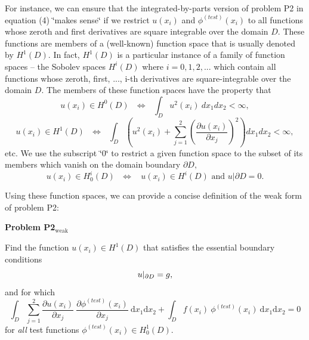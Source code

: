 For instance, we can ensure that the integrated-\/by-\/parts version of problem P2 in equation (4) \char`\"{}makes sense\char`\"{} if we restrict $u(x_i)$ and $\phi^{(test)}(x_i)$ to all functions whose zeroth and first derivatives are square integrable over the domain $D$. These functions are members of a (well-\/known) function space that is usually denoted by $H^{1}(D)$. In fact, $H^{1}(D)$ is a particular instance of a family of function spaces -- the Sobolev spaces $H^{i}(D)$ where $i=0,1,2,...$ which contain all functions whose zeroth, first, ..., i-\/th derivatives are square-\/integrable over the domain $D$. The members of these function spaces have the property that \[ u(x_i) \in H^0(D) \ \ \ \iff \ \ \ \int_D u^2(x_i) \ dx_1 dx_2 < \infty, \] \[ u(x_i) \in H^1(D) \ \ \ \iff \ \ \ \int_D \left( u^2(x_i) + \sum_{j=1}^2 \left(\frac{\partial u(x_i)}{\partial x_j}\right)^2 \right) dx_1 dx_2 < \infty, \] etc. We use the subscript \char`\"{}0\char`\"{} to restrict a given function space to the subset of its members which vanish on the domain boundary $ \partial D,$ \[ u(x_i) \in H^i_0(D) \ \ \ \iff \ \ \ \ u(x_i) \in H^i(D) \mbox{\ \ \ and \ \ \ } u|{\partial D}=0. \]

Using these function spaces, we can provide a concise definition of the weak form of problem P2\-: \begin{center} \begin{TabularC}{1}
\hline
\begin{center} \begin{center}{\bfseries  Problem P2$_{\mbox{weak}}$  }\end{center}  Find the function $ u(x_i) \in H^1(D) $ that satisfies the essential boundary conditions \[ \hfill u|_{\partial D} = g, \] and for which \[ \int_D \sum_{j=1}^2 \frac{\partial u(x_i)}{\partial x_j} \ \frac{\partial \phi^{(test)}(x_i)}{\partial x_j} \ \mbox{d}x_1 \mbox{d}x_2 + \int_D f(x_i) \ \phi^{(test)}(x_i) \ \mbox{d}x_1 \mbox{d}x_2 = 0 \] for {\itshape all} test functions $ \phi^{(test)}(x_i) \in H^1_0(D). $ \end{center}    \\
\end{TabularC}
\end{center} 

